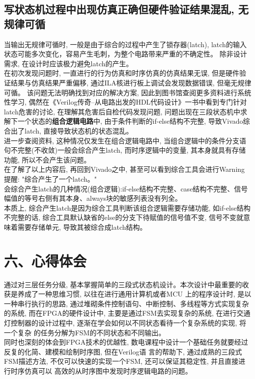 \documentclass{article}
\newcommand{\fourhao}{\fontsize{14pt}{\baselineskip}\selectfont} %
\newcommand{\xiaosihao}{\fontsize{12pt}{\baselineskip}\selectfont} %
\begin{document}
\subsection*{写状态机过程中出现仿真正确但硬件验证结果混乱, 无规律可循}
当输出无规律可循时, 一般是由于综合的过程中产生了锁存器(latch), latch的输入状态可能多次变化，容易产生毛刺，为整个电路带来严重的不确定性。
除非设计需求, 在设计时应该极力避免latch的产生。\\
在初次发现问题时, 一直进行的行为仿真和时序仿真的仿真结果无误, 但是硬件验证结果与仿真结果严重偏移, 通过ILA核进行板上调试会发现数据错误, 但毫无规律可循。
该问题无法明确找到对应的解决方案, 因此到图书馆查阅更多资料进行系统性学习, 偶然在《Verilog传奇--从电路出发的HDL代码设计》一书中看到专门针对latch危害的讨论, 在理解其危害后自检代码发现问题, 
问题出现在三段状态机中求解下一个状态的\textbf{组合逻辑电路}中, 由于条件判断的if-else结构不完整, 导致Vivado综合出了latch, 直接导致状态机的状态混乱。\\
进一步查阅资料, 这种情况仅发生在组合逻辑电路中, 当组合逻辑中的条件分支语句不完整(不收敛)一般会综合产生latch, 而时序逻辑中的变量, 其本身就具有存储功能, 所以不会产生该问题。\\
在了解了以上内容后, 再回到Vivado之中, 甚至可以看到综合工具会进行Warning提醒: "综合产生了一个latch。"\\
会综合产生latch的几种情况(组合逻辑):if-else结构不完整、case结构不完整、信号幅值的等号右侧有其本身、always块的敏感列表没有列全。\\
本质上, 综合产生latch是因为综合工具判断该组合逻辑需要存储功能, 如if-else结构不完整的话, 综合工具默认缺省的else的分支下待赋值的信号值不变, 信号不变就意味着需要存储单元, 导致其被综合成latch结构。
\section*{\fourhao 六、心得体会}
\xiaosihao
{}
通过对三层任务分级, 基本掌握简单的三段式状态机设计。本次设计中最重要的收获是养成了一种思维习惯, 以往在进行通用计算机或者MCU
上的程序设计时, 是以一种串行执行的思路, 通过堆砌条件控制语句、中断控制、多线程等方式实现复杂的系统, 而在FPGA的硬件设计中, 
主要是通过FSM去实现复杂的系统, 在进行交通灯控制器的设计过程中, 逐渐在学会如何以不同状态看待一个复杂系统的实现, 将一个复杂
的任务分解为FSM的不同状态和不同输出。\\
同时也深刻的体会到FPGA技术的优越性, 数电课程中设计一个基础任务就要经过反复的化简、建模和绘制时序图, 但在Verilog语
言的帮助下, 通过成熟的三段式FSM描述方法, 不仅可以快速的实现一个FSM, 还可以保证其稳定性, 并且直接进行时序仿真可以
高效的从时序图中发现时序逻辑电路的问题。
\end{document}
